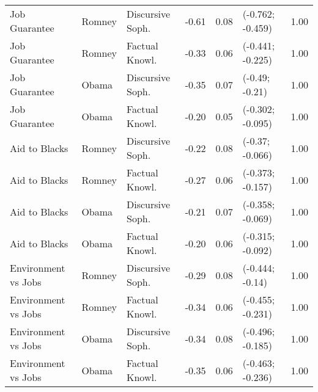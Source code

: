 \begin{table}[ht]
\begin{tabular}{lllrrlr}
  Job Guarantee & Romney & Discursive Soph. & -0.61 & 0.08 & (-0.762; -0.459) & 1.00 \\ 
  Job Guarantee & Romney & Factual Knowl. & -0.33 & 0.06 & (-0.441; -0.225) & 1.00 \\ 
  Job Guarantee & Obama & Discursive Soph. & -0.35 & 0.07 & (-0.49; -0.21) & 1.00 \\ 
  Job Guarantee & Obama & Factual Knowl. & -0.20 & 0.05 & (-0.302; -0.095) & 1.00 \\ 
  Aid to Blacks & Romney & Discursive Soph. & -0.22 & 0.08 & (-0.37; -0.066) & 1.00 \\ 
  Aid to Blacks & Romney & Factual Knowl. & -0.27 & 0.06 & (-0.373; -0.157) & 1.00 \\ 
  Aid to Blacks & Obama & Discursive Soph. & -0.21 & 0.07 & (-0.358; -0.069) & 1.00 \\ 
  Aid to Blacks & Obama & Factual Knowl. & -0.20 & 0.06 & (-0.315; -0.092) & 1.00 \\ 
  Environment vs Jobs & Romney & Discursive Soph. & -0.29 & 0.08 & (-0.444; -0.14) & 1.00 \\ 
  Environment vs Jobs & Romney & Factual Knowl. & -0.34 & 0.06 & (-0.455; -0.231) & 1.00 \\ 
  Environment vs Jobs & Obama & Discursive Soph. & -0.34 & 0.08 & (-0.496; -0.185) & 1.00 \\ 
  Environment vs Jobs & Obama & Factual Knowl. & -0.35 & 0.06 & (-0.463; -0.236) & 1.00 \\ 
   \hline
\end{tabular}
\end{table}
